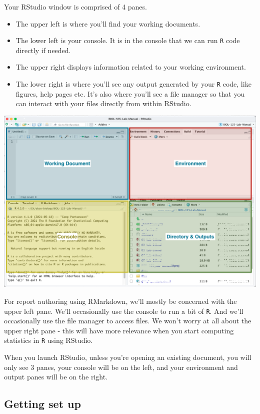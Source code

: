 \documentclass[
]{book}
\providecommand{\tightlist}{%
  \setlength{\itemsep}{0pt}\setlength{\parskip}{0pt}}
\begin{document}
Your RStudio window is comprised of 4 panes.

\begin{itemize}
\tightlist
\item
  The upper left is where you'll find your working documents.
\item
  The lower left is your console. It is in the console that we can run \texttt{R} code directly if needed.
\item
  The upper right displays information related to your working environment.
\item
  The lower right is where you'll see any output generated by your \texttt{R} code, like figures, help pages etc. It's also where you'll see a file manager so that you can interact with your files directly from within RStudio.
\end{itemize}

\includegraphics{images/Intro-RStudio_20220101.png}

For report authoring using RMarkdown, we'll mostly be concerned with the upper left pane. We'll occasionally use the console to run a bit of \texttt{R}. And we'll occasionally use the file manager to access files. We won't worry at all about the upper right pane - this will have more relevance when you start computing statistics in \texttt{R} using RStudio.

When you launch RStudio, unless you're opening an existing document, you will only see 3 panes, your console will be on the left, and your environment and output panes will be on the right.

\hypertarget{getting-set-up}{%
\subsection*{Getting set up}\label{getting-set-up}}
\end{document}
